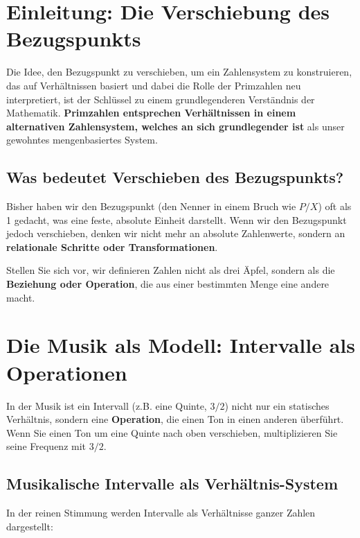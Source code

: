 	\section{Einleitung: Die Verschiebung des Bezugspunkts}
	
	Die Idee, den Bezugspunkt zu verschieben, um ein Zahlensystem zu konstruieren, das auf Verhältnissen basiert und dabei die Rolle der Primzahlen neu interpretiert, ist der Schlüssel zu einem grundlegenderen Verständnis der Mathematik. \textbf{Primzahlen entsprechen Verhältnissen in einem alternativen Zahlensystem, welches an sich grundlegender ist} als unser gewohntes mengenbasiertes System.
	
	\subsection{Was bedeutet Verschieben des Bezugspunkts?}
	
	Bisher haben wir den Bezugspunkt (den Nenner in einem Bruch wie $P/X$) oft als 1 gedacht, was eine feste, absolute Einheit darstellt. Wenn wir den Bezugspunkt jedoch verschieben, denken wir nicht mehr an absolute Zahlenwerte, sondern an \textbf{relationale Schritte oder Transformationen}.
	
	Stellen Sie sich vor, wir definieren Zahlen nicht als drei Äpfel, sondern als die \textbf{Beziehung oder Operation}, die aus einer bestimmten Menge eine andere macht.
	
	\section{Die Musik als Modell: Intervalle als Operationen}
	
	In der Musik ist ein Intervall (z.B. eine Quinte, $3/2$) nicht nur ein statisches Verhältnis, sondern eine \textbf{Operation}, die einen Ton in einen anderen überführt. Wenn Sie einen Ton um eine Quinte nach oben verschieben, multiplizieren Sie seine Frequenz mit $3/2$.
	
	\subsection{Musikalische Intervalle als Verhältnis-System}
	
	In der reinen Stimmung werden Intervalle als Verhältnisse ganzer Zahlen dargestellt:
	
